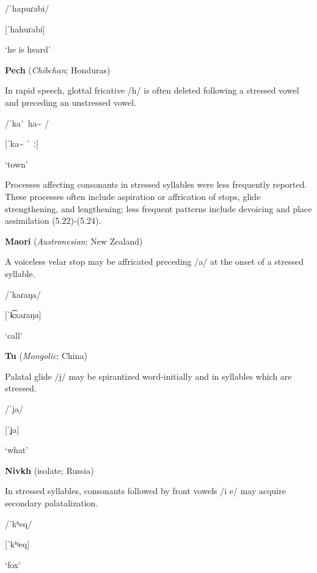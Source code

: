 /ˈhapuɾabi/

[ˈhahuɾabi]

‘he is heard’

\citep[123]{Chacon2012}
\z

\ea\label{ex:(5.21)}
  \textbf{Pech} (\textit{Chibchan}; Honduras)

In rapid speech, glottal fricative /h/ is often deleted following a stressed vowel and preceding an unstressed vowel.

/ˈka\`{} ha\~{} /

[ˈka\~{} \`{} ː]

‘town’

\citep[24]{Holt1999}
\z

  Processes affecting consonants in stressed syllables were less frequently reported. These processes often include aspiration or affrication of stops, glide strengthening, and lengthening; less frequent patterns include devoicing and place assimilation (5.22)-(5.24).

\ea\label{ex:(5.22)}
  \textbf{Maori} (\textit{Austronesian}; New Zealand)

A voiceless velar stop may be affricated preceding /a/ at the onset of a stressed syllable.

/ˈkaɾaŋa/

[ˈk͡xaɾaŋa]

‘call’

\citep[521-2]{Bauer1999}

\z

\ea\label{ex:(5.23)}
  \textbf{Tu} (\textit{Mongolic}; China)

Palatal glide /j/ may be spirantized word-initially and in syllables which are stressed.

/ˈja/

[ˈʝa]

‘what’

\citep[31-2]{Slater2003}
\z

\ea\label{ex:(5.24)}
  \textbf{Nivkh} (isolate; Russia)

In stressed syllables, consonants followed by front vowels /i e/ may acquire secondary palatalization.

/ˈkʰeq/

[ˈkʰʲeq]

‘fox’

\citep[23]{Shiraishi2006}
\z

